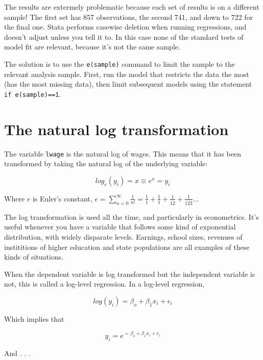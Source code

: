 \documentclass[12pt]{article}
\begin{document}
The results are extermely problematic because each set of results is
on a different sample! The first set has 857 observations, the second
741, and down to 722 for the final one. Stata performs casewise
deletion when running regressions, and doesn't adjust unless you tell
it to. In this case none of the standard tests of model fit are
relevant, because it's not the same sample. 

The solution is to use the \texttt{e(sample)} command to limit the
sample to the relevant analysis sample. First, run the model that
restricts the data the most (has the most missing data), then limit
subsequent models using the statement \texttt{if e(sample)==1}.

\section{The natural log transformation}

The variable \texttt{lwage} is the natural log of wages. This means
that it has been transformed by taking the natural log of the
underlying variable:

\begin{equation*}
  log_e(y_i)=x \equiv e^x=y_i
\end{equation*}


Where $e$ is Euler's constant, $e=\sum_{n=0}^\infty
\frac{1}{n!}=\frac{1}{1}+\frac{1}{1}+\frac{1}{1 \dot 2}+\frac{1}{1 \dot
  2 \dot 3} \ldots$

The log transformation is used all the time, and particularly in
econometrics. It's useful whenever you have a variable that follows
some kind of exponential distribution, with widely disparate
levels. Earnings, school sizes, revenues of instititions of higher
education and state populations are all examples of these kinds of
situations. 

When the dependent variable is log transformed but the independent
variable is not, this is called a log-level regression. In a log-level
regression,  


\begin{equation*}
  log(y_i)=\beta_o+\beta_1x_i+\epsilon_i
\end{equation*}

Which implies that

\begin{equation*}
  y_i=e^{=\beta_o+\beta_1 x_i + \epsilon_i}
\end{equation*}

And . . .
\end{document}
